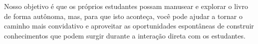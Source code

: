 \documentclass[11pt]{extarticle}
\begin{document}
Nosso objetivo é que os próprios estudantes possam manusear e explorar o livro de forma autônoma, mas, para que isto aconteça, você pode ajudar a tornar o caminho mais convidativo e aproveitar as oportunidades espontâneas de construir conhecimentos que podem surgir durante a interação direta com os estudantes.



\end{document}
